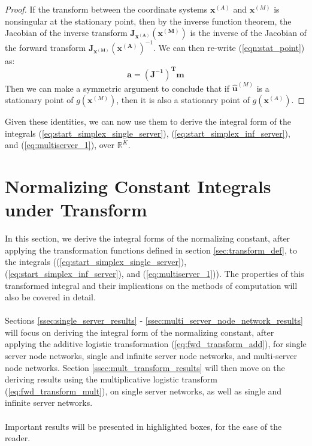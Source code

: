 \begin{proof}
    If the transform between the coordinate systems \(\mathbf{x}^{(A)}\) and \(\mathbf{x}^{(M)}\) is nonsingular at the stationary point, then by the inverse function theorem, the Jacobian of the inverse transform \(\mathbf{J_{x^{(A)}}(x^{(M)})}\) is the inverse of the Jacobian of the forward transform \(\mathbf{J_{x^{(M)}}(x^{(A)})}^{-1}\). We can then re-write (\ref{eqn:stat_point}) as:
    \begin{equation*}
        \mathbf{a} = \mathbf{(J^{-1})^T} \mathbf{m}
    \end{equation*}
    Then we can make a symmetric argument to conclude that if \(\mathbf{\hat{u}}^{(M)}\) is a stationary point of \(g(\mathbf{x}^{(M)})\), then it is also a stationary point of \(g(\mathbf{x}^{(A)})\).
\end{proof}

Given these identities, we can now use them to derive the integral form of the integrals (\ref{eq:start_simplex_single_server}), (\ref{eq:start_simplex_inf_server}), and (\ref{eq:multiserver_1}), over \(\mathbb{R}^K\).
 

\section{Normalizing Constant Integrals under Transform}\label{sec:NC_integral_under_transform}

In this section, we derive the integral forms of the normalizing constant, after applying the transformation functions defined in section \ref{sec:transform_def}, to the integrals ((\ref{eq:start_simplex_single_server}), (\ref{eq:start_simplex_inf_server}), and (\ref{eq:multiserver_1})). The properties of this transformed integral and their implications on the methods of computation will also be covered in detail. 
\\\\
Sections \ref{ssec:single_server_results} - \ref{ssec:multi_server_node_network_results} will focus on deriving the integral form of the normalizing constant, after applying the additive logistic transformation (\ref{eq:fwd_transform_add}), for single server node networks, single and infinite server node networks, and multi-server node networks. Section \ref{ssec:mult_transform_results} will then move on the deriving results using the multiplicative logistic transform (\ref{eq:fwd_transform_mult}), on single server networks, as well as single and infinite server networks.
\\\\
Important results will be presented in highlighted boxes, for the ease of the reader.

